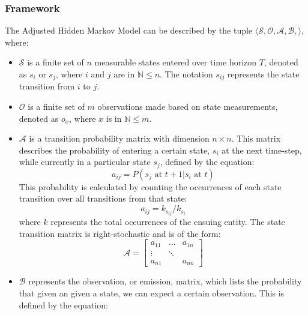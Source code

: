 \documentclass[conference]{IEEEtran}
\begin{document}
\subsubsection{Framework}

The Adjusted Hidden Markov Model can be described by the tuple $\langle \mathcal{S},\mathcal{O},\mathcal{A},\mathcal{B},\rangle$, where:
\begin{itemize}
    \item $\mathcal{S}$ is a finite set of $n$ measurable states entered over time horizon $T$, denoted as $s_{i}$ or $s_{j}$, where $i$ and $j$ are in $\mathbb{N} \leq n$. The notation $s_{ij}$ represents the state transition from $i$ to $j$.
    \item $\mathcal{O}$ is a finite set of $m$ observations made based on state measurements, denoted as $o_{x}$, where $x$ is in $\mathbb{N} \leq m$.
    \item $\mathcal{A}$ is a transition probability matrix with dimension $n \times n$. This matrix describes the probability of entering a certain state, $s_{i}$ at the next time-step, while currently in a particular state $s_{j}$, defined by the equation:
        \begin{equation}
            a_{ij} = P(s_j \text{ at } t+1 \vert s_i \text{ at } t)
        \end{equation}
        This probability is calculated by counting the occurrences of each state transition over all transitions from that state:
        \begin{equation} \label{eq:transbuild}
            a_{ij} = k_{s_{ij}}/k_{s_{i}}
        \end{equation}
        where $k$ represents the total occurrences of the ensuing entity.
    The state transition matrix is right-stochastic and is of the form:
        \begin{equation}
            \mathcal{A} = 
                    \begin{bmatrix}
                        a_{11} & \dots & a_{1n} \\
                        \vdots & \ddots & \\
                        a_{n1} &    & a_{nn}
                    \end{bmatrix}
        \end{equation}
    \item $\mathcal{B}$ represents the observation, or emission, matrix, which lists the probability that given an given a state, we can expect a certain observation. This is defined by the equation:

\end{itemize}
\end{document}
